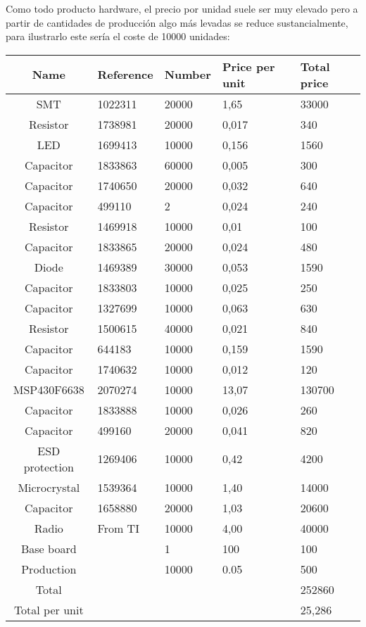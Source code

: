 	Como todo producto hardware, el precio por unidad suele ser muy elevado pero a partir de cantidades de producción algo más levadas se reduce sustancialmente, para 
	ilustrarlo este sería el coste de 10000 unidades:\\

\begin{tabular}{| c |l | l | l | l |} 
	\hline
		Name & Reference & Number & Price per unit & Total price\\ \hline
		SMT & 1022311 & 20000 & 1,65 & 33000\\ \hline
		Resistor & 1738981 & 20000 & 0,017 & 340\\ \hline
		LED & 1699413 & 10000 & 0,156 & 1560\\ \hline
		Capacitor & 1833863 & 60000 & 0,005 & 300\\ \hline
		Capacitor & 1740650 & 20000 & 0,032 & 640\\ \hline
		Capacitor & 499110 & 2 & 0,024 & 240\\ \hline
		Resistor & 1469918 & 10000 & 0,01 & 100\\ \hline
		Capacitor & 1833865 & 20000 & 0,024  & 480\\ \hline
		Diode & 1469389 & 30000 & 0,053 & 1590\\ \hline
	   	Capacitor & 1833803 & 10000 & 0,025 & 250\\ \hline
 		Capacitor & 1327699 & 10000 & 0,063 & 630 \\ \hline
  		Resistor & 1500615 & 40000 & 0,021 & 840\\ \hline
	 	Capacitor & 644183 & 10000 & 0,159 & 1590 \\ \hline
	 	Capacitor & 1740632 & 10000 & 0,012  & 120\\ \hline
	 	MSP430F6638 & 2070274 & 10000 & 13,07 & 130700\\ \hline
	 	Capacitor & 1833888 & 10000 & 0,026  & 260\\ \hline
	 	Capacitor & 499160 & 20000 & 0,041  & 820\\ \hline
	 	ESD protection & 1269406 & 10000 & 0,42  & 4200\\ \hline
	 	Microcrystal & 1539364 & 10000 & 1,40 & 14000\\ \hline
	 	Capacitor & 1658880 & 20000 & 1,03  & 20600\\ \hline
	 	Radio & From TI & 10000 & 4,00 & 40000\\ \hline
		Base board &  & 1 & 100 & 100\\ \hline
		Production &  & 10000 & 0.05 & 500\\ \hline
	 	Total &  &  &  & 252860\\ \hline
	 	Total per unit &  &  &  & 25,286\\ \hline
	\hline
\end{tabular}\\\\











